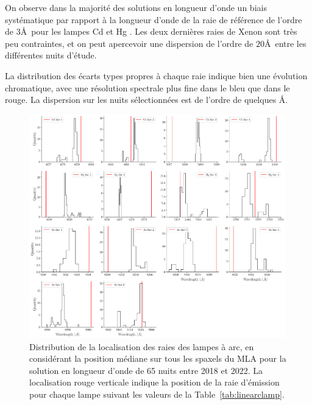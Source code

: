 \documentclass[../main/main.tex]{subfiles}
\begin{document}
On observe dans
la majorité des solutions en longueur d'onde un biais systématique par
rapport à la longueur d'onde de la raie de référence de l'ordre de
$3$\AA\ pour les lampes Cd et Hg . Les deux dernières raies de Xenon sont très peu contraintes, et
on peut apercevoir une dispersion de l'ordre de $20$\AA\ entre les
différentes nuits d'étude. 

La distribution des écarts types propres à chaque raie indique bien une
évolution chromatique, avec une résolution spectrale plus fine dans le
bleu que dans le rouge. La dispersion sur les nuits sélectionnées est de
l'ordre de quelques \AA.

\begin{figure}[h!]
  \centering
  \includegraphics[width=0.99\textwidth]{../figures/06_irf/lineloc.pdf}
  \caption[Distribution de la localisation des raies des lampes à
  arc]{Distribution de la localisation des raies des lampes à arc, en
    considérant la position médiane sur tous les spaxels du MLA pour la
    solution en longueur d'onde de 65 nuits entre 2018 et 2022. La
    localisation rouge verticale indique la position de la raie
    d'émission pour
    chaque lampe suivant les valeurs de la
    Table~\ref{tab:linearclamp}.}
  \label{fig:lineloc}
\end{figure}
\end{document}
